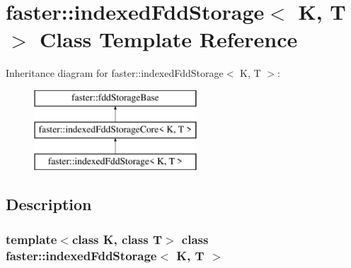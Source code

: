 \hypertarget{classfaster_1_1indexedFddStorage}{}\section{faster\+:\+:indexed\+Fdd\+Storage$<$ K, T $>$ Class Template Reference}
\label{classfaster_1_1indexedFddStorage}
Inheritance diagram for faster\+:\+:indexed\+Fdd\+Storage$<$ K, T $>$\+:\begin{figure}[H]
\begin{center}
\leavevmode
\includegraphics[height=3.000000cm]{classfaster_1_1indexedFddStorage}
\end{center}
\end{figure}


\subsection{Description}
\subsubsection*{template$<$class K, class T$>$\newline
class faster\+::indexed\+Fdd\+Storage$<$ K, T $>$}

